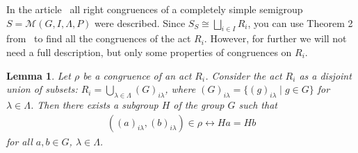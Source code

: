 \documentclass{birkau}
\numberwithin{equation}{section}
\theoremstyle{plain}
\newtheorem{lemma}[theorem]{Lemma}
\theoremstyle{definition}
\begin{document}
	\par In the article~\cite{oehmke} all right congruences of a completely simple semigroup $S = \mathcal{M}(G,I,\Lambda,P)$ were described. Since $S_S \cong \bigsqcup_{i \in I} R_i$, you can use Theorem 2 from~\cite{oehmke} to find all the congruences of the act $R_i$. However, for further we will not need a full description, but only some properties of congruences on $R_i$.
	
	\begin{lemma} \label{l2.3}
	    Let $\rho$ be a congruence of an act $ R_i$. Consider the act $R_i$ as a disjoint union of subsets: $R_i = \bigcup_{\lambda \in \Lambda}(G)_{i \lambda}$, where $(G)_{i \lambda} = \{ (g)_{i \lambda} \mid g \in G \}$ for $\lambda \in \Lambda$. Then there exists a subgroup $H$ of the group $G$ such that
		\begin{gather}
			((a)_{i \lambda},(b)_{i \lambda}) \in \rho \leftrightarrow Ha = Hb \label{f2.1}
		\end{gather}
		for all $a,b \in G$, $\lambda \in \Lambda$.
	\end{lemma}
\end{document}
